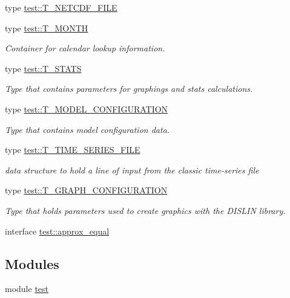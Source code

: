 \begin{DoxyCompactItemize}
type \hyperlink{typetest_1_1_t___n_e_t_c_d_f___f_i_l_e}{test::T\_\-NETCDF\_\-FILE}
\item 
type \hyperlink{typetest_1_1_t___m_o_n_t_h}{test::T\_\-MONTH}
\begin{DoxyCompactList}\small\item\em Container for calendar lookup information. \item\end{DoxyCompactList}\item 
type \hyperlink{typetest_1_1_t___s_t_a_t_s}{test::T\_\-STATS}
\begin{DoxyCompactList}\small\item\em Type that contains parameters for graphings and stats calculations. \item\end{DoxyCompactList}\item 
type \hyperlink{typetest_1_1_t___m_o_d_e_l___c_o_n_f_i_g_u_r_a_t_i_o_n}{test::T\_\-MODEL\_\-CONFIGURATION}
\begin{DoxyCompactList}\small\item\em Type that contains model configuration data. \item\end{DoxyCompactList}\item 
type \hyperlink{typetest_1_1_t___t_i_m_e___s_e_r_i_e_s___f_i_l_e}{test::T\_\-TIME\_\-SERIES\_\-FILE}
\begin{DoxyCompactList}\small\item\em data structure to hold a line of input from the classic time-\/series file \item\end{DoxyCompactList}\item 
type \hyperlink{typetest_1_1_t___g_r_a_p_h___c_o_n_f_i_g_u_r_a_t_i_o_n}{test::T\_\-GRAPH\_\-CONFIGURATION}
\begin{DoxyCompactList}\small\item\em Type that holds parameters used to create graphics with the DISLIN library. \item\end{DoxyCompactList}\item 
interface \hyperlink{interfacetest_1_1approx__equal}{test::approx\_\-equal}
\end{DoxyCompactItemize}
\subsection*{Modules}
\begin{DoxyCompactItemize}
\item 
module \hyperlink{namespacetest}{test}
\end{DoxyCompactItemize}
